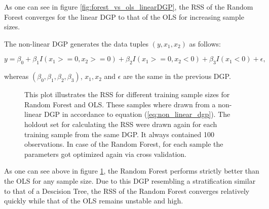 As one can see in figure \ref{fig:forest_vs_ols_linearDGP}, the RSS of the Random Forest converges for the linear DGP
to that of the OLS for increasing sample sizes. 

The non-linear DGP generates the data tuples \( (y, x_{1}, x_{2}) \) as follows:

\begin{equation}\label{eq:non_linear_dgp}
    y = \beta_{0} + \beta_{1} I(x_{1} >= 0, x_{2} >= 0) + \beta_{2} I(x_{1} >= 0, x_{2} < 0) + \beta_{3} I(x_{1} < 0) + \epsilon,
\end{equation}

whereas \( (\beta_{0}, \beta_{1}, \beta_{2}, \beta_{3}) \), \( x_{1}, x_{2} \) and \(  \epsilon \)
are the same in the previous DGP.

\begin{figure}[H]
    \captionsetup{format=plain}
    \caption
        {This plot illustrates the RSS for different training sample sizes for Random Forest and OLS.
        These samples where drawn from a non-linear DGP in accordance to equation (\ref{eq:non_linear_dgp}).
        The holdout set for calculating the RSS were drawn again for each training sample from the same DGP.
        It always contained 100 observations. In case of the Random Forest, for each sample the parameters
        got optimized again via cross validation.
        }
    \label{fig:forest_vs_ols_nonLinearDGP}
\end{figure}

As one can see above in figure \ref{fig:forest_vs_ols_nonLinearDGP}, the Random Forest performs strictly better
than the OLS for any sample size. Due to this DGP resembling a stratification similar to
that of a Descision Tree, the RSS of the Random Forest converges relatively quickly while that of the OLS
remains unstable and high. 